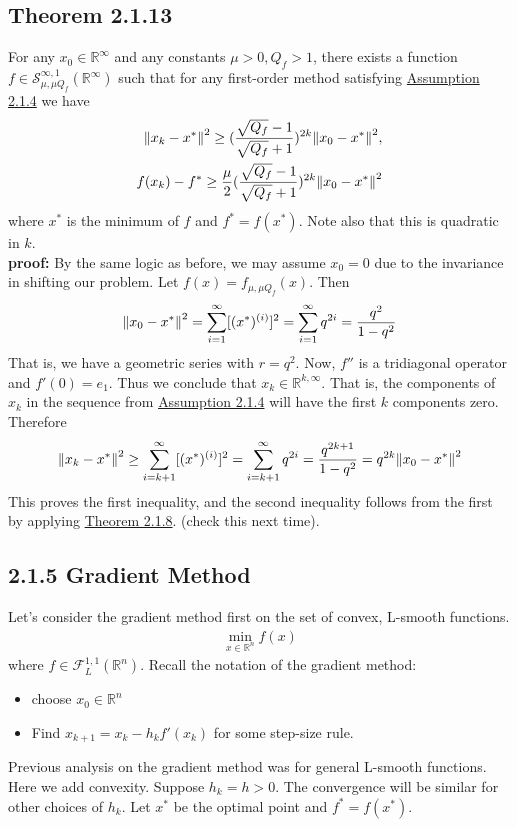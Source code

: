 \documentclass[12pt,a4paper]{article}
\begin{document}
	 \subsection*{Theorem 2.1.13}\label{thm2113}
	 For any $x_0 \in \mathbb{R}^{\infty}$ and any constants $\mu > 0, Q_f > 1$, there exists a function $f \in \mathcal{S}_{\mu, \mu Q_f}^{\infty, 1}(\mathbb{R}^{\infty})$ such that for any first-order method satisfying \hyperref[A214]{Assumption 2.1.4} we have
	 \begin{align*}
	 	\norm{x_k - x^*}^2 \geq (\frac{\sqrt{Q_f} - 1}{\sqrt{Q_f}+1})^{2k}\norm{x_0 - x^*}^2, \\
	 	f(x_k) - f^* \geq \frac{\mu}{2}(\frac{\sqrt{Q_f} - 1}{\sqrt{Q_f}+1})^{2k}\norm{x_0 - x^*}^2
	 \end{align*}
	 where $x^*$ is the minimum of $f$ and $f^* = f(x^*)$. Note also that this is quadratic in $k$.\\
	 \textbf{proof:} By the same logic as before, we may assume $x_0 = 0$ due to the invariance in shifting our problem. Let $f(x) = f_{\mu, \mu Q_f}(x)$. Then
	 \begin{align*}
	 	\norm{x_0 - x^*}^2 = \sum_{i=1}^{\infty}[(x^*)^{(i)}]^2 = \sum_{i=1}^{\infty}q^{2i} = \frac{q^2}{1 - q^2}
	 \end{align*}
	 That is, we have a geometric series with $r = q^2$. Now, $f''$ is a tridiagonal operator and $f'(0) = e_1$. Thus we conclude that $x_k \in \mathbb{R}^{k, \infty}$. That is, the components of $x_k$ in the sequence from \hyperref[A214]{Assumption 2.1.4} will have the first $k$ components zero. Therefore
	 \begin{align*}
	 	\norm{x_k - x^*}^2 \geq \sum_{i=k+1}^{\infty}[(x^*)^{(i)}]^2 = \sum_{i=k+1}^{\infty}q^{2i} = \frac{q^{2k+1}}{1 - q^2} = q^{2k}\norm{x_0 - x^*}^2
	 \end{align*}
	 This proves the first inequality, and the second inequality follows from the first by applying \hyperref[thm218]{Theorem 2.1.8}. (check this next time).
	 
	 \subsection*{2.1.5 Gradient Method}
	 Let's consider the gradient method first on the set of convex, L-smooth functions. 
	 \begin{align*}
	 	\min_{x \in \mathbb{R}^n} f(x)
	 \end{align*}
	 where $f \in \mathcal{F}_L^{1,1}(\mathbb{R}^n)$. Recall the notation of the gradient method:
	 \begin{itemize}
	 	\item choose $x_0 \in \mathbb{R}^n$
	 	\item Find $x_{k+1} = x_k - h_kf'(x_k)$ for some step-size rule.
	 \end{itemize}
	 Previous analysis on the gradient method was for general L-smooth functions. Here we add convexity.
	 Suppose $h_k = h > 0$. The convergence will be similar for other choices of $h_k$. Let $x^*$ be the optimal point and $f^* = f(x^*)$. 
\end{document}
